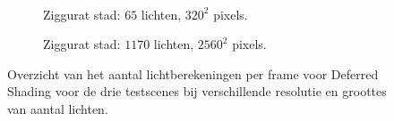 \begin{figure}[t]
\begin{adjustbox}{minipage=\textwidth, scale=0.55}
\begin{subfigure}[b]{0.8\textwidth}
      \label{fig:cs-lc-frames-deferred:alley-high}
    \end{subfigure}
  \end{adjustbox} \\
  \begin{adjustbox}{minipage=\textwidth, scale=0.55}
    \begin{subfigure}[b]{0.8\textwidth}
      \centering
      \def\svgwidth{\textwidth}
      
      \caption{Ziggurat stad: $65$ lichten, $320^2$ pixels.}
      \label{fig:cs-lc-frames-deferred:city-low}
    \end{subfigure}
  \end{adjustbox}\hspace{-0.075\textwidth}  %
  \begin{adjustbox}{minipage=\textwidth, scale=0.55}
    \begin{subfigure}[b]{0.8\textwidth}
      \centering
      \def\svgwidth{\textwidth}
      
      \caption{Ziggurat stad: $1170$ lichten, $2560^2$ pixels.}
      \label{fig:cs-lc-frames-deferred:city-high}
    \end{subfigure}
  \end{adjustbox}
  \caption{Overzicht van het aantal lichtberekeningen per frame voor Deferred Shading
           voor de drie testscenes bij verschillende resolutie en groottes van aantal
           lichten.}
  \label{fig:cs-lc-frames-deferred}
\end{figure}

